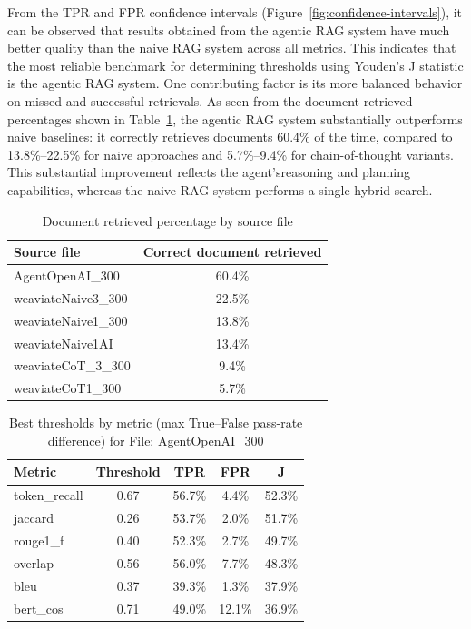 From the TPR and FPR confidence intervals (Figure~\ref{fig:confidence-intervals}), it can be observed that results obtained from the agentic RAG system have much better quality than the naive RAG system across all metrics. This indicates that the most reliable benchmark for determining thresholds using Youden's J statistic is the agentic RAG system. One contributing factor is its more balanced behavior on missed and successful retrievals. As seen from the document retrieved percentages shown in Table~\ref{tab:doc-retrieved-by-source}, the agentic RAG system substantially outperforms naive baselines: it correctly retrieves documents 60.4\% of the time, compared to 13.8\%–22.5\% for naive approaches and 5.7\%–9.4\% for chain-of-thought variants. This substantial improvement reflects the agent'sreasoning and planning capabilities, whereas the naive RAG system performs a single hybrid search.

\begin{table}[htbp]
    \centering
    \begin{tabular}{l c}
        \hline
        Source file & Correct document retrieved \\
        \hline
    AgentOpenAI\_300 & 60.4\% \\
    weaviateNaive3\_300 & 22.5\% \\
    weaviateNaive1\_300 & 13.8\% \\
    weaviateNaive1AI & 13.4\% \\
    weaviateCoT\_3\_300 & 9.4\% \\
    weaviateCoT1\_300 & 5.7\% \\
        \hline
    \end{tabular}
    \caption{Document retrieved percentage by source file}\label{tab:doc-retrieved-by-source}
\end{table}

\begin{table}[htbp]
  \centering
  \begin{tabular}{l c c c c}
    \hline
    Metric & Threshold & TPR & FPR & J \\
    \hline
    token\_recall & 0.67 & 56.7\% & 4.4\%  & 52.3\% \\
    jaccard       & 0.26 & 53.7\% & 2.0\%  & 51.7\% \\
    rouge1\_f     & 0.40 & 52.3\% & 2.7\%  & 49.7\% \\
    overlap       & 0.56 & 56.0\% & 7.7\%  & 48.3\% \\
    bleu          & 0.37 & 39.3\% & 1.3\%  & 37.9\% \\
    bert\_cos     & 0.71 & 49.0\% & 12.1\% & 36.9\% \\
    \hline
  \end{tabular}
    \caption{Best thresholds by metric (max True--False pass-rate difference) for File: AgentOpenAI\_300}\label{tab:agentopenai300-best-thresholds}
\end{table}

